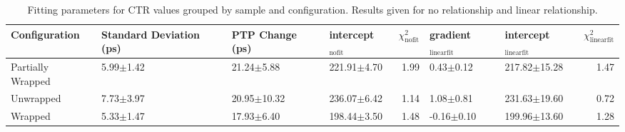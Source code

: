 \begin{table}
\caption{\label{tab:ctrfit-20-results} Fitting parameters for CTR values grouped by sample and configuration. Results given for no relationship and linear relationship.}
\begin{tabular}{llllrllr}
\hline
Configuration & Standard Deviation (ps) & PTP Change (ps) & intercept$_\text{nofit}$ &  $\chi^2_\text{nofit}$ & gradient$_\text{linearfit}$ & intercept$_\text{linearfit}$ &  $\chi^2_\text{linearfit}$ \\
\hline
    Partially Wrapped   &  5.99$\pm$1.42 &   21.24$\pm$5.88 &  221.91$\pm$4.70 &                   1.99 &       0.43$\pm$0.12 &   217.82$\pm$15.28 &                    1.47 \\
        Unwrapped     &  7.73$\pm$3.97 &  20.95$\pm$10.32 &  236.07$\pm$6.42 &                   1.14 &       1.08$\pm$0.81 &   231.63$\pm$19.60 &                    0.72 \\
        Wrapped       &  5.33$\pm$1.47 &   17.93$\pm$6.40 &  198.44$\pm$3.50 &                   1.48 &      -0.16$\pm$0.10 &   199.96$\pm$13.60 &                    1.28 \\
\hline
\end{tabular}
\end{table}